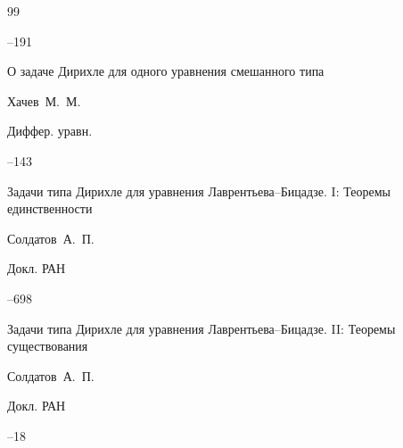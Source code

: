\begin{thebibliography}{99}



--191





\paper О задаче Дирихле для одного уравнения смешанного типа

\by  Хачев~М.~М.

\jour Диффер. уравн.




--143






\paper Задачи типа Дирихле для уравнения Лаврентьева--Бицадзе. I: Теоремы единственности

\by  Солдатов~А.~П.

\jour Докл. РАН




--698












\paper Задачи типа Дирихле для уравнения Лаврентьева--Бицадзе. II: Теоремы существования

\by  Солдатов~А.~П.

\jour Докл. РАН




--18




\end{thebibliography}
